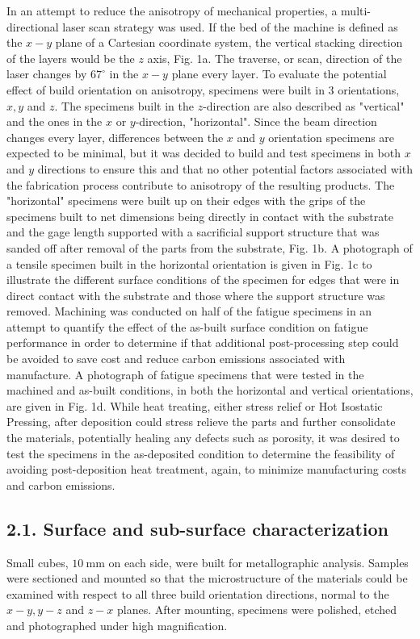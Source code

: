 \documentclass[10pt]{article}
\begin{document}
In an attempt to reduce the anisotropy of mechanical properties, a multi-directional laser scan strategy was used. If the bed of the machine is defined as the $x-y$ plane of a Cartesian coordinate system, the vertical stacking direction of the layers would be the $z$ axis, Fig. 1a. The traverse, or scan, direction of the laser changes by $67^{\circ}$ in the $x-y$ plane every layer. To evaluate the potential effect of build orientation on anisotropy, specimens were built in 3 orientations, $x, y$ and $z$. The specimens built in the $z$-direction are also described as "vertical" and the ones in the $x$ or $y$-direction, "horizontal". Since the beam direction changes every layer, differences between the $x$ and $y$ orientation specimens are expected to be minimal, but it was decided to build and test specimens in both $x$ and $y$ directions to ensure this and that no other potential factors associated with the fabrication process contribute to anisotropy of the resulting products. The "horizontal" specimens were built up on their edges with the grips of the specimens built to net dimensions being directly in contact with the substrate and the gage length supported with a sacrificial support structure that was sanded off after removal of the parts from the substrate, Fig. 1b. A photograph of a tensile specimen built in the horizontal orientation is given in Fig. 1c to illustrate the different surface conditions of the specimen for edges that were in direct contact with the substrate and those where the support structure was removed. Machining was conducted on half of the fatigue specimens in an attempt to quantify the effect of the as-built surface condition on fatigue performance in order to determine if that additional post-processing step could be avoided to save cost and reduce carbon emissions associated with manufacture. A photograph of fatigue specimens that were tested in the machined and as-built conditions, in both the horizontal and vertical orientations, are given in Fig. 1d. While heat treating, either stress relief or Hot Isostatic Pressing, after deposition could stress relieve the parts and further consolidate the materials, potentially healing any defects such as porosity, it was desired to test the specimens in the as-deposited condition to determine the feasibility of avoiding post-deposition heat treatment, again, to minimize manufacturing costs and carbon emissions.

\subsection*{2.1. Surface and sub-surface characterization}
Small cubes, $10 \mathrm{~mm}$ on each side, were built for metallographic analysis. Samples were sectioned and mounted so that the microstructure of the materials could be examined with respect to all three build orientation directions, normal to the $x-y, y-z$ and $z-x$ planes. After mounting, specimens were polished, etched and photographed under high magnification.
\end{document}
